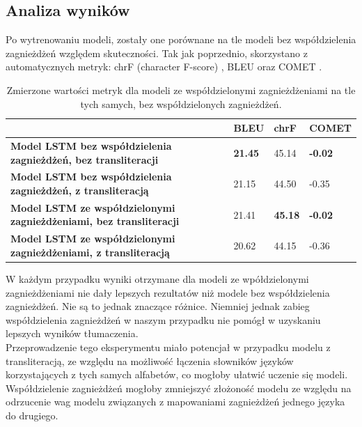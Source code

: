 \documentclass[
    left=2.5cm,         %
    right=2.5cm,        %
    top=2.5cm,          %
    bottom=3cm,         %
    bindingoffset=6mm,  %
    nohyphenation=false %
]{eiti/eiti-report}
\begin{document}
\subsection{Analiza wyników}

Po wytrenowaniu modeli, zostały one porównane na tle modeli bez współdzielenia zagnieżdżeń względem skuteczności. Tak jak poprzednio, skorzystano z automatycznych metryk: chrF (character F-score) \cite{popovic-2015-chrf}, BLEU \cite{BLEU} oraz COMET \cite{COMET}.
    
\begin{table}[H]
\centering
\footnotesize
\begin{tabular}{ |p{7cm}||p{2.5cm}|p{2.5cm}|p{2.5cm}|  }
    \hline
    \footnotesize{} & \footnotesize{BLEU} & \footnotesize{chrF}&  \footnotesize{COMET} \\
    \hline
     \textbf{Model LSTM bez współdzielenia zagnieżdżeń, bez transliteracji} & \textbf{21.45}  &  45.14  & \textbf{-0.02} \\
     \hline
     \textbf{Model LSTM bez współdzielenia zagnieżdżeń, z transliteracją} & 21.15  &  44.50  & -0.35 \\
     \hline
     \textbf{Model LSTM ze współdzielonymi zagnieżdżeniami, bez transliteracji} & 21.41  &  \textbf{45.18}  & \textbf{-0.02} \\
     \hline
     \textbf{Model LSTM ze współdzielonymi zagnieżdżeniami, z transliteracją} & 20.62 & 44.15 & -0.36 \\
     \hline
\end{tabular}
\caption{Zmierzone wartości metryk dla modeli ze współdzielonymi zagnieżdżeniami na tle tych samych, bez współdzielonych zagnieżdżeń.}
\label{tab:attr_table}
\end{table}

W każdym przypadku wyniki otrzymane dla modeli ze wpółdzielonymi zagnieżdżeniami nie dały lepszych rezultatów niż modele bez współdzielenia zagnieżdżeń. Nie są to jednak znaczące różnice. Niemniej jednak zabieg współdzielenia zagnieżdżeń w naszym przypadku nie pomógł w uzyskaniu lepszych wyników tłumaczenia. \\

Przeprowadzenie tego eksperymentu miało potencjał w przypadku modelu z transliteracją, ze względu na możliwość łączenia słowników języków korzystających z tych samych alfabetów, co mogłoby ułatwić uczenie się modeli. Współdzielenie zagnieżdżeń mogłoby zmniejszyć złożoność modelu ze względu na odrzucenie wag modelu związanych z mapowaniami zagnieżdżeń jednego języka do drugiego.\\
\newpage
\end{document}
